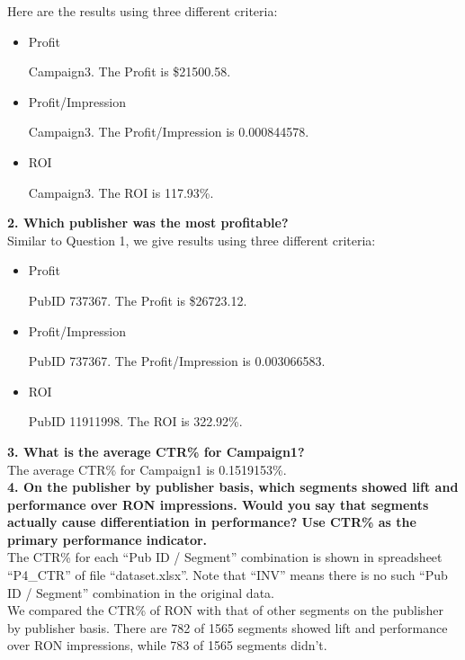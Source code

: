 \documentclass[12pt]{article}
\begin{document}
Here are the results using three different criteria:

\begin{itemize}
\item Profit

	Campaign3. The Profit is \$21500.58.
\item Profit/Impression

	Campaign3. The Profit/Impression is 0.000844578.
\item ROI

	Campaign3. The ROI is 117.93\%.
\end{itemize}

{\bf 2. Which publisher was the most profitable?} \\

Similar to Question 1, we give results using three different criteria:

\begin{itemize}
\item Profit

	PubID 737367. The Profit is \$26723.12.
\item Profit/Impression

	PubID 737367. The Profit/Impression is 0.003066583.
\item ROI

	PubID 11911998. The ROI is 322.92\%.
\end{itemize}

{\bf 3. What is the average CTR\% for Campaign1?} \\

The average CTR\% for Campaign1 is 0.1519153\%. \\

{\bf 4. On the publisher by publisher basis, which segments showed lift and performance over RON impressions. Would you say that segments actually cause differentiation in performance? Use CTR\% as the primary performance indicator.} \\

The CTR\% for each ``Pub ID / Segment'' combination is shown in spreadsheet ``P4\_CTR'' of file ``dataset.xlsx''. Note that ``INV'' means there is no such ``Pub ID / Segment'' combination in the original data. \\

We compared the CTR\% of RON with that of other segments on the publisher by publisher basis. There are 782 of 1565 segments showed lift and performance over RON impressions, while 783 of 1565 segments didn't. \\
\end{document}
